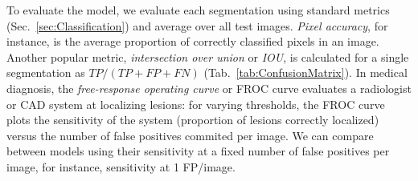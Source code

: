 To evaluate the model, we evaluate each segmentation using standard metrics (Sec.~\ref{sec:Classification}) and average over all test images. \emph{Pixel accuracy}, for instance, is the average proportion of correctly classified pixels in an image.
Another popular metric, \emph{intersection over union} or \emph{IOU}, is calculated for a single segmentation as $TP/(TP+FP+FN)$ (Tab.~\ref{tab:ConfusionMatrix}).
In medical diagnosis, the \emph{free-response operating curve} or {FROC curve} evaluates a radiologist or CAD system at localizing lesions: for varying thresholds, the FROC curve plots the sensitivity of the system (proportion of lesions correctly localized) versus the number of false positives commited per image. We can compare between models using their sensitivity at a fixed number of false positives per image, for instance, sensitivity at 1 FP/image.

